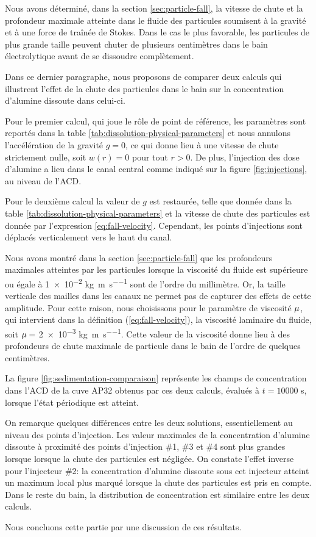 Nous avons déterminé, dans la section \ref{sec:particle-fall}, la vitesse
de chute et la profondeur maximale atteinte dans le fluide des
particules soumisent à la gravité et à une force de traînée de
Stokes. Dans le cas le plus favorable, les particules de plus grande
taille peuvent chuter de plusieurs centimètres dans le bain
électrolytique avant de se dissoudre complètement.

Dans ce dernier paragraphe, nous proposons de comparer deux calculs
qui illustrent l'effet de la chute des particules dans le bain sur la
concentration d'alumine dissoute dans celui-ci.

Pour le premier calcul, qui joue le rôle de point de référence, les
paramètres sont reportés dans la table
\ref{tab:dissolution-physical-parameters} et nous annulons
l'accélération de la gravité $g = 0$, ce qui donne lieu à une vitesse
de chute strictement nulle, soit $w(r) = 0$ pour tout $r>0$. De plus,
l'injection des dose d'alumine a lieu dans le canal central comme
indiqué sur la figure \ref{fig:injections}, au niveau de l'ACD.

Pour le deuxième calcul la valeur de $g$ est restaurée, telle que
donnée dans la table \ref{tab:dissolution-physical-parameters} et la
vitesse de chute des particules est donnée par l'expression
\ref{eq:fall-velocity}. Cependant, les points d'injections sont
déplacés verticalement vers le haut du canal.

Nous avons montré dans la section \ref{sec:particle-fall} que les
profondeurs maximales atteintes par les particules lorsque la viscosité
du fluide est supérieure ou égale à \num{1e-2}
\si{\kilo\gram\per\meter\per\second} sont de l'ordre du
millimètre. Or, la taille verticale des mailles dans les canaux ne
permet pas de capturer des effets de cette amplitude. Pour cette
raison, nous choisissons pour le paramètre de viscosité
$\mu$, qui intervient dans la définition
(\ref{eq:fall-velocity}), la viscosité laminaire du fluide, soit
$\mu = $ \num{2e-3}
\si{\kilo\gram\per\meter\per\second}. Cette valeur de la viscosité
donne lieu à des profondeurs de chute maximale de particule dans le
bain de l'ordre de quelques centimètres.

La figure \ref{fig:sedimentation-comparaison} représente les champs de
concentration dans l'ACD de la cuve AP32 obtenus par ces deux calculs,
évalués à $t = \num{10000}$ \si{\second}, lorsque l'état périodique est
atteint.

On remarque quelques différences entre les deux solutions,
essentiellement au niveau des points d'injection. Les valeur maximales
de la concentration d'alumine dissoute à proximité des points
d'injection \#1, \#3 et \#4 sont plus grandes lorsque lorsque la chute
des particules est négligée. On constate l'effet inverse pour
l'injecteur \#2: la concentration d'alumine dissoute sous cet
injecteur atteint un maximum local plus marqué lorsque la chute des
particules est pris en compte. Dans le reste du bain, la distribution
de concentration est similaire entre les deux calculs.

Nous concluons cette partie par une discussion de ces résultats.
